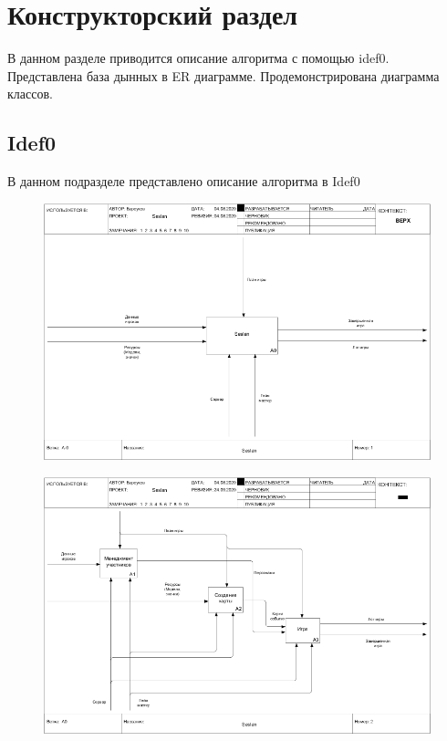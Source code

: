 \newpage
\section{Конструкторский раздел}
	
	В данном разделе приводится описание алгоритма с помощью idef0. 
	Представлена база дынных в ER диаграмме. 
	Продемонстрирована диаграмма классов.
	
\subsection{Idef0}

	В данном подразделе представлено описание алгоритма в Idef0
	
	\begin{figure}[H]
		\centering
		\includegraphics[width=0.7\linewidth]{src/Idef0/01_A-0}
		\caption{}
		\label{fig:01a-0}
	\end{figure}
	
	\begin{figure}[H]
		\centering
		\includegraphics[width=0.7\linewidth]{src/Idef0/02_A0}
		\caption{}
		\label{fig:02a0}
	\end{figure}
	
